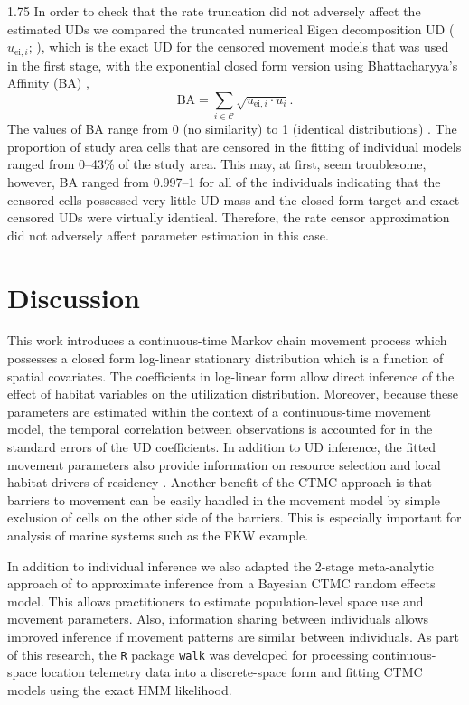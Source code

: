 \documentclass[12pt]{article}
\newcommand{\fC}{\ensuremath{\mathcal{C}}}
\begin{document}
\begin{spacing}{1.75}
In order to check that the rate truncation did not adversely affect the estimated UDs we compared the truncated numerical Eigen decomposition UD ($u_{\text{ei},i}$; \citealt{wilsonestimating}), which is the exact UD for the censored movement models that was used in the first stage, with the exponential closed form version using Bhattacharyya's Affinity (BA) \citep{BHATTACHARYYA1943a},
\[
\text{BA} = \sum_{i \in \fC} \sqrt{u_{\text{ei},i} \cdot u_{i}}.
\]
The values of BA range from 0 (no similarity) to 1 (identical distributions) \citep{FiebergKochanny2005a}. The proportion of study area cells that are censored in the fitting of individual models ranged from 0--43\% of the study area. This may, at first, seem troublesome, however, BA ranged from 0.997--1 for all of the individuals indicating that the censored cells possessed very little UD mass and the closed form target and exact censored UDs were virtually identical. Therefore, the rate censor approximation did not adversely affect parameter estimation in this case.     

\section{Discussion}

This work introduces a continuous-time Markov chain movement process which possesses a closed form log-linear stationary distribution which is a function of spatial covariates. The coefficients in log-linear form allow direct inference of the effect of habitat variables on the utilization distribution. Moreover, because these parameters are estimated within the context of a continuous-time movement model, the temporal correlation between observations is accounted for in the standard errors of the UD coefficients. In addition to UD inference, the fitted movement parameters also provide information on resource selection and local habitat drivers of residency \citep{Hanks:2015aa, Johnson353516}. Another benefit of the CTMC approach is that barriers to movement can be easily handled in the movement model by simple exclusion of cells on the other side of the barriers. This is especially important for analysis of marine systems such as the FKW example.    

In addition to individual inference we also adapted the 2-stage meta-analytic approach of \cite{johnson2022greater} to approximate inference from a Bayesian CTMC random effects model. This allows practitioners to estimate population-level space use and movement parameters. Also, information sharing between individuals allows improved inference if movement patterns are similar between individuals. As part of this research, the {\tt R} package {\tt walk} was developed for processing continuous-space location telemetry data into a discrete-space form and fitting CTMC models using the exact HMM likelihood.      


\end{spacing}
\end{document}
